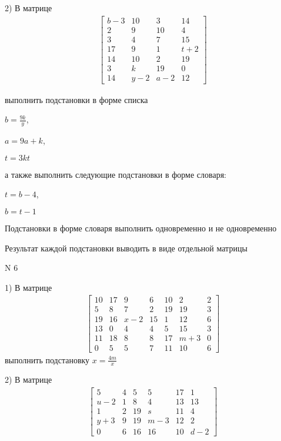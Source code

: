 \documentclass[11pt]{report}
\begin{document}
    2) В матрице
\begin{align*}
\left[\begin{matrix}b - 3 & 10 & 3 & 14\\2 & 9 & 10 & 4\\3 & 4 & 7 & 15\\17 & 9 & 1 & t + 2\\14 & 10 & 2 & 19\\3 & k & 19 & 0\\14 & y - 2 & a - 2 & 12\end{matrix}\right]
\end{align*}

выполнить подстановки в форме списка

$b=\frac{9 k}{y}$,

$a=9 a + k$,

$t=3 k t$

а также выполнить следующие подстановки в форме словаря:

$t=b - 4$,

$b=t - 1$


    Подстановки в форме словаря выполнить одновременно и не одновременно


    Результат каждой подстановки выводить в виде отдельной матрицы

\newpage
N 6


    1) В матрице
\begin{align*}
\left[\begin{matrix}10 & 17 & 9 & 6 & 10 & 2 & 2\\5 & 8 & 7 & 2 & 19 & 19 & 3\\19 & 16 & x - 2 & 15 & 1 & 12 & 6\\13 & 0 & 4 & 4 & 5 & 15 & 3\\11 & 18 & 8 & 8 & 17 & m + 3 & 0\\0 & 5 & 5 & 7 & 11 & 10 & 6\end{matrix}\right]
\end{align*}
выполнить подстановку $x=\frac{4 m}{x}$


    2) В матрице
\begin{align*}
\left[\begin{matrix}5 & 4 & 5 & 5 & 17 & 1\\u - 2 & 1 & 8 & 4 & 13 & 13\\1 & 2 & 19 & s & 11 & 4\\y + 3 & 9 & 19 & m - 3 & 12 & 2\\0 & 6 & 16 & 16 & 10 & d - 2\end{matrix}\right]
\end{align*}
\end{document}
